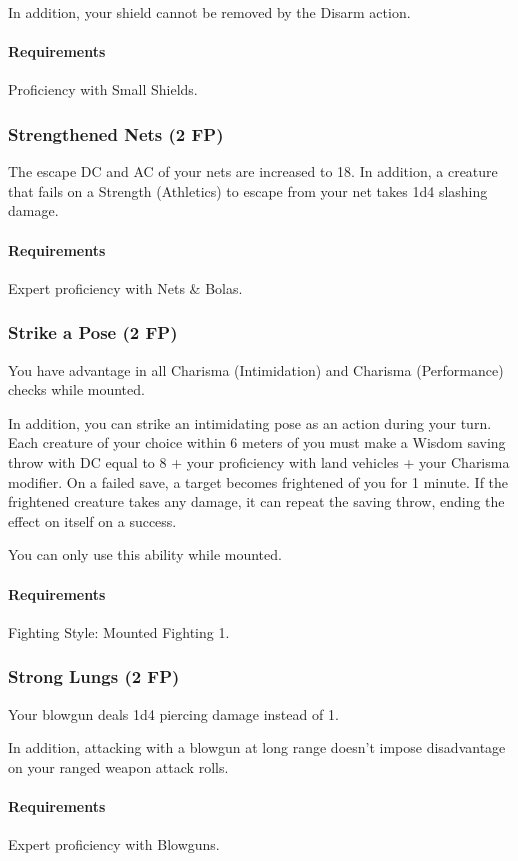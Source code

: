     In addition, your shield cannot be removed by the Disarm action.
    \paragraph{Requirements} Proficiency with Small Shields.
\subsubsection{Strengthened Nets (2 FP)} \label{feat::strengthenednets}
    The escape DC and AC of your nets are increased to 18.
    In addition, a creature that fails on a Strength (Athletics) to escape from your net takes 1d4 slashing damage.
    \paragraph{Requirements} Expert proficiency with Nets \& Bolas.
\subsubsection{Strike a Pose (2 FP)} \label{feat::strikeapose}
    You have advantage in all Charisma (Intimidation) and Charisma (Performance) checks while mounted.

    In addition, you can strike an intimidating pose as an action during your turn.
    Each creature of your choice within 6 meters of you must make a Wisdom saving throw with DC equal to 8 + your proficiency with land vehicles + your Charisma modifier.
    On a failed save, a target becomes frightened of you for 1 minute.
    If the frightened creature takes any damage, it can repeat the saving throw, ending the effect on itself on a success.

    You can only use this ability while mounted.
    \paragraph{Requirements} Fighting Style: Mounted Fighting 1.
\subsubsection{Strong Lungs (2 FP)} \label{feat::stronglungs}
    Your blowgun deals 1d4 piercing damage instead of 1.

    In addition, attacking with a blowgun at long range doesn't impose disadvantage on your ranged weapon attack rolls.
    \paragraph{Requirements} Expert proficiency with Blowguns.
